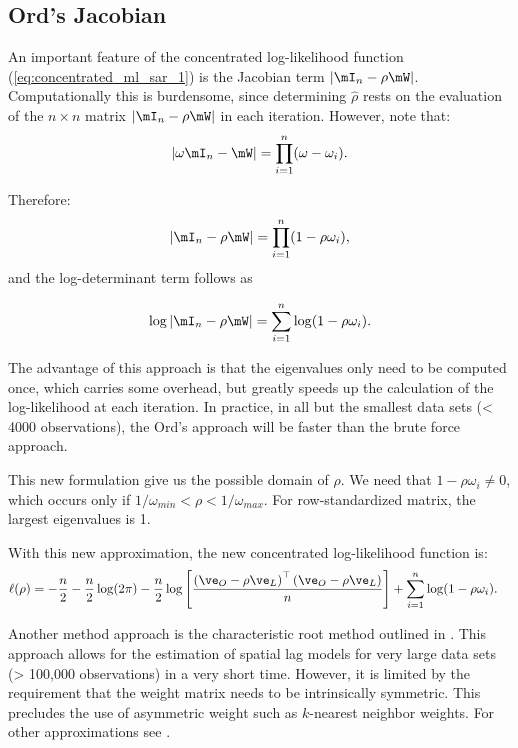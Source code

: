 \subsection{Ord's Jacobian}

An important feature of the concentrated log-likelihood function (\ref{eq:concentrated_ml_sar_1}) is the Jacobian term $\left|\mI_n - \rho\mW\right|$. Computationally this is burdensome, since determining $\widehat{\rho}$ rests on the evaluation of the $n\times n$ matrix $\left|\mI_n - \rho\mW\right|$ in each iteration. However, \cite{ord1975estimation} note that:
\begin{equation*}
	\left|\omega\mI_n -\mW\right|=\prod_{i=1}^n(\omega-\omega_i).
\end{equation*}	

Therefore:
\begin{equation*}
\left|\mI_n -\rho\mW\right|=\prod_{i=1}^n(1-\rho\omega_i),
\end{equation*}	
%
and the log-determinant term follows as

\begin{equation}\label{eq:Ord-determinant}
\log\left|\mI_n -\rho\mW\right|=\sum_{i=1}^n\log(1 - \rho\omega_i).
\end{equation}

The advantage of this approach is that the eigenvalues only need to be computed once, which carries some overhead, but greatly speeds up the calculation of the log-likelihood at each iteration. In practice, in all but the smallest data sets (< 4000 observations), the Ord's approach will be faster than the brute force approach. 

This new formulation give us the possible domain of $\rho$. We need that $1 - \rho \omega_i \neq 0$, which occurs only if $1/\omega_{min} < \rho < 1/\omega_{max}$. For row-standardized matrix, the largest eigenvalues is 1. 

With this new approximation, the new concentrated log-likelihood function is:
\begin{equation}\label{eq:concentrated_ml_sar_2}
  \begin{aligned}
\ell(\rho)& =-\frac{n}{2}-\frac{n}{2}\log(2\pi) - \frac{n}{2}\log\left[\frac{\left(\ve_O - \rho\ve_L\right)^\top\left(\ve_O - \rho\ve_L\right)}{n}\right] + \sum_{i=1}^n\log(1 - \rho\omega_i).
  \end{aligned}
\end{equation}	

Another method approach is the characteristic root method outlined in \cite{smirnov2001fast}. This approach allows for the estimation of spatial lag models for very large data sets (> 100,000 observations) in a very short time. However, it is limited by the requirement that the weight matrix needs to be intrinsically symmetric. This precludes the use of asymmetric weight such as $k$-nearest neighbor weights. For other approximations see \citet[][chapter 4]{lesage2010introduction}.

